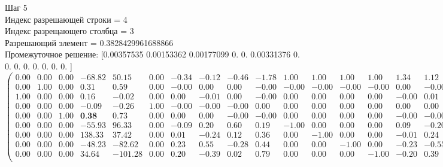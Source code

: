 \documentclass{article}
\begin{document}
\begin{flushleft}
    Шаг 5\\
Индекс разрешающей строки = 4\\
Индекс разрещающего столбца = 3\\
Разрешающий элемент = 0.3828429961688866\\
Промежуточное решение:
 [0.00357535 0.00153362 0.00177099 0.         0.         0.00331376
 0.         0.         0.         0.         0.         0.
 0.         0.        ]
\begin{equation*}
\begin{pmatrix}
 0.00 & 0.00 & 0.00 & -68.82 &   50.15 & 0.00 & -0.34 & -0.12 & -0.46 & -1.78 &  1.00 &  1.00 &  1.00 &  1.00 &  1.34 &  1.12 &  1.46 &  2.78 & 0.00 & 0.00 & 0.00 & 0.00 & -1.30 \\
 0.00 & 1.00 & 0.00 &   0.31 &    0.59 & 0.00 & -0.00 &  0.00 &  0.00 & -0.00 & -0.00 & -0.00 & -0.00 & -0.00 &  0.00 & -0.00 & -0.00 &  0.00 & 0.00 & 0.00 & 0.00 & 0.00 &  0.00 \\
 1.00 & 0.00 & 0.00 &   0.16 &   -0.02 & 0.00 &  0.00 & -0.01 &  0.00 & -0.00 &  0.00 &  0.00 &  0.00 &  0.00 & -0.00 &  0.01 & -0.00 &  0.00 & 0.00 & 0.00 & 0.00 & 0.00 &  0.00 \\
 0.00 & 0.00 & 0.00 &  -0.09 &   -0.26 & 1.00 & -0.00 & -0.00 & -0.00 &  0.00 &  0.00 &  0.00 &  0.00 &  0.00 &  0.00 &  0.00 &  0.00 & -0.00 & 0.00 & 0.00 & 0.00 & 0.00 &  0.00 \\
 0.00 & 0.00 & 1.00 &   \textbf{0.38} &    0.73 & 0.00 &  0.00 &  0.00 & -0.00 & -0.00 &  0.00 &  0.00 &  0.00 &  0.00 & -0.00 & -0.00 &  0.00 &  0.00 & 0.00 & 0.00 & 0.00 & 0.00 &  0.00 \\
 0.00 & 0.00 & 0.00 & -55.93 &   96.33 & 0.00 & -0.09 &  0.20 &  0.60 &  0.19 & -1.00 &  0.00 &  0.00 &  0.00 &  0.09 & -0.20 & -0.60 & -0.19 & 1.00 & 0.00 & 0.00 & 0.00 &  0.11 \\
 0.00 & 0.00 & 0.00 & 138.33 &   37.42 & 0.00 &  0.01 & -0.24 &  0.12 &  0.36 &  0.00 & -1.00 &  0.00 &  0.00 & -0.01 &  0.24 & -0.12 & -0.36 & 0.00 & 1.00 & 0.00 & 0.00 &  0.76 \\
 0.00 & 0.00 & 0.00 & -48.23 &  -82.62 & 0.00 &  0.23 &  0.55 & -0.28 &  0.44 &  0.00 &  0.00 & -1.00 &  0.00 & -0.23 & -0.55 &  0.28 & -0.44 & 0.00 & 0.00 & 1.00 & 0.00 &  0.06 \\
 0.00 & 0.00 & 0.00 &  34.64 & -101.28 & 0.00 &  0.20 & -0.39 &  0.02 &  0.79 &  0.00 &  0.00 &  0.00 & -1.00 & -0.20 &  0.39 & -0.02 & -0.79 & 0.00 & 0.00 & 0.00 & 1.00 &  0.38 \\
\end{pmatrix}
\end{equation*}
\end{flushleft}
\end{document}
